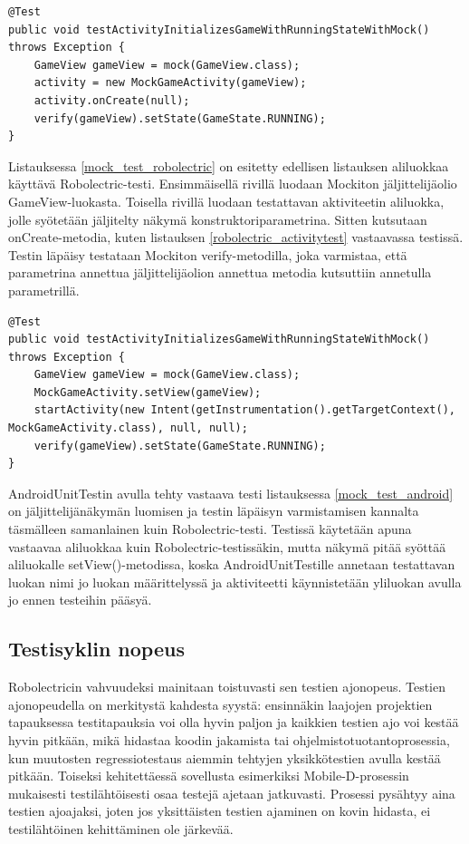 \begin{lstlisting}[float,label=mock_test_robolectric, caption=Jäljittelyä käyttävä testi Robolectrcicillä]
@Test
public void testActivityInitializesGameWithRunningStateWithMock() throws Exception {
	GameView gameView = mock(GameView.class);
	activity = new MockGameActivity(gameView);
	activity.onCreate(null);
	verify(gameView).setState(GameState.RUNNING);
}
\end{lstlisting}

Listauksessa \ref{mock_test_robolectric} on esitetty edellisen listauksen aliluokkaa käyttävä Robolectric-testi. Ensimmäisellä rivillä luodaan Mockiton jäljittelijäolio GameView-luokasta. Toisella rivillä luodaan testattavan aktiviteetin aliluokka, jolle syötetään jäljitelty näkymä konstruktoriparametrina. Sitten kutsutaan onCreate-metodia, kuten listauksen \ref{robolectric_activitytest} vastaavassa testissä. Testin läpäisy testataan Mockiton verify-metodilla, joka varmistaa, että parametrina annettua jäljittelijäolion annettua metodia kutsuttiin annetulla parametrillä.

\begin{lstlisting}[float,label=mock_test_android, caption=Jäljittelyä käyttävä testi AndroidUnitTestillä]
@Test
public void testActivityInitializesGameWithRunningStateWithMock() throws Exception {
	GameView gameView = mock(GameView.class);
	MockGameActivity.setView(gameView);
	startActivity(new Intent(getInstrumentation().getTargetContext(), MockGameActivity.class), null, null);
	verify(gameView).setState(GameState.RUNNING);
}
\end{lstlisting}

AndroidUnitTestin avulla tehty vastaava testi listauksessa \ref{mock_test_android} on jäljittelijänäkymän luomisen ja testin läpäisyn varmistamisen kannalta täsmälleen samanlainen kuin Robolectric-testi. Testissä käytetään apuna vastaavaa aliluokkaa kuin Robolectric-testissäkin, mutta näkymä pitää syöttää aliluokalle setView()-metodissa, koska AndroidUnitTestille annetaan testattavan luokan nimi jo luokan määrittelyssä ja aktiviteetti käynnistetään yliluokan avulla jo ennen testeihin pääsyä.

\subsection{Testisyklin nopeus}

Robolectricin vahvuudeksi mainitaan toistuvasti sen testien ajonopeus. Testien ajonopeudella on merkitystä kahdesta syystä: ensinnäkin laajojen projektien tapauksessa testitapauksia voi olla hyvin paljon ja kaikkien testien ajo voi kestää hyvin pitkään, mikä hidastaa koodin jakamista tai ohjelmistotuotantoprosessia, kun muutosten regressiotestaus aiemmin tehtyjen yksikkötestien avulla kestää pitkään. Toiseksi kehitettäessä sovellusta esimerkiksi Mobile-D-prosessin mukaisesti testilähtöisesti osaa testejä ajetaan jatkuvasti. Prosessi pysähtyy aina testien ajoajaksi, joten jos yksittäisten testien ajaminen on kovin hidasta, ei testilähtöinen kehittäminen ole järkevää.


